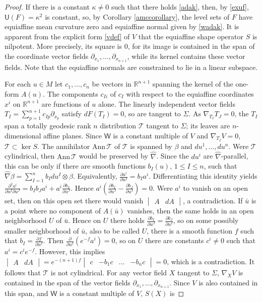 \documentclass [leqno, 10pt]{amsart}
\theoremstyle{definition}
\numberwithin{equation}{section}
\newcommand{\U}{\mathsf{U}}
\newcommand{\ka}{\kappa}
\newcommand{\T}{\mathcal{T}}
\newcommand{\nm}{\mathsf{W}}
\newcommand{\pr}{\partial}
\newcommand{\be}{\beta}
\newcommand{\hnabla}{\widehat{\nabla}}
\newcommand{\tensor}{\otimes}
\newcommand{\rea}{\mathbb R}
\newcommand{\ann}{\text{Ann}\,}
\begin{document}
\begin{proof}
If there is a constant $\ka \neq 0$ such that there holds \eqref{adak}, then, by \eqref{exuf}, $\U(F) = \ka^{2}$ is constant, so, by Corollary \ref{amccorollary}, the level sets of $F$ have equiaffine mean curvature zero and equiaffine normal given by \eqref{wadak}. It is apparent from the explicit form \eqref{vdef} of $V$ that the equiaffine shape operator $S$ is nilpotent. More precisely, its square is $0$, for its image is contained in the span of the coordinate vector fields $\pr_{x_{1}}, \dots, \pr_{x_{n+1}}$, while its kernel contains these vector fields. Note that the equiaffine normals are constrained to lie in a linear subspace. 

For each $u \in M$ let $c_{1}, \dots, c_{n}$ be vectors in $\rea^{n+1}$ spanning the kernel of the one-form $A(u)$. The components $c_{Ii}$ of $c_{I}$ with respect to the equiaffine coordinates $x^{i}$ on $\rea^{n+1}$ are functions of $u$ alone. The linearly independent vector fields $T_{I} = \sum_{p = 1}^{n+1}c_{Ip}\pr_{x_{p}}$ satisfy $dF(T_{I}) = 0$, so are tangent to $\Sigma$. As $\nabla_{T_{I}}T_{J} = 0$, the $T_{I}$ span a totally geodesic rank $n$ distribution $\T$ tangent to $\Sigma$; its leaves are $n$-dimensional affine planes. Since $\nm$ is a constant multiple of $V$ and $\nabla_{T_{I}}V = 0$, $\T \subset  \ker S$. The annihilator $\ann \T$ of $\T$ is spanned by $\be$ and $du^{1}, \dots, du^{n}$. Were $\T$ cylindrical, then $\ann \T$ would be preserved by $\hnabla$. Since the $du^{i}$ are $\hnabla$-parallel, this can be only if there are smooth functions $b_{I}(u)$, $1 \leq I \leq n$, such that $\hnabla \be = \sum_{I = 1}^{n}b_{I}du^{I}\tensor \be$. Equivalently, $\frac{\pr a^{i}}{\pr u^{I}} = b_{I}a^{i}$. Differentiating this identity yields $\tfrac{\pr^{2}a^{i}}{\pr u^{I}\pr u^{J}} = b_{I}b_{J}a^{i} + a^{i}\tfrac{\pr b_{I}}{\pr u^{J}}$. Hence $a^{i}(\tfrac{\pr b_{I}}{\pr u^{J}} - \tfrac{\pr b_{J}}{\pr u^{I}}) = 0$. Were $a^{i}$ to vanish on an open set, then on this open set there would vanish $\begin{vmatrix} A & dA \end{vmatrix}$, a contradiction. If $\bar{u}$ is a point where no component of $A(\bar{u})$ vanishes, then the same holds in an open neighborhood $U$ of $\bar{u}$. Hence on $U$ there holds $\tfrac{\pr b_{I}}{\pr u^{J}} = \tfrac{\pr b_{J}}{\pr u^{I}}$, so on some possibly smaller neighborhood of $\bar{u}$, also to be called $U$, there is a smooth function $f$ such that $b_{I} = \tfrac{\pr f}{\pr u^{I}}$. Then $\tfrac{\pr}{\pr u^{I}}(e^{-f}a^{i}) = 0$, so on $U$ there are constants $c^{i} \neq 0$ such that $a^{i} = c^{i}e^{-f}$. However, this implies $\begin{vmatrix} A & dA \end{vmatrix} = e^{-(n+1)f}\begin{vmatrix}c & -b_{1}c & \dots & -b_{n}c \end{vmatrix} = 0$, which is a contradiction. It follows that $\T$ is not cylindrical. For any vector field $X$ tangent to $\Sigma$, $\nabla_{X}V$ is contained in the span of the vector fields $\pr_{x_{1}}, \dots, \pr_{x_{n+1}}$. Since $V$ is also contained in this span, and $\nm$ is a constant multiple of $V$, $S(X)$ is 
\end{proof}
\end{document}
